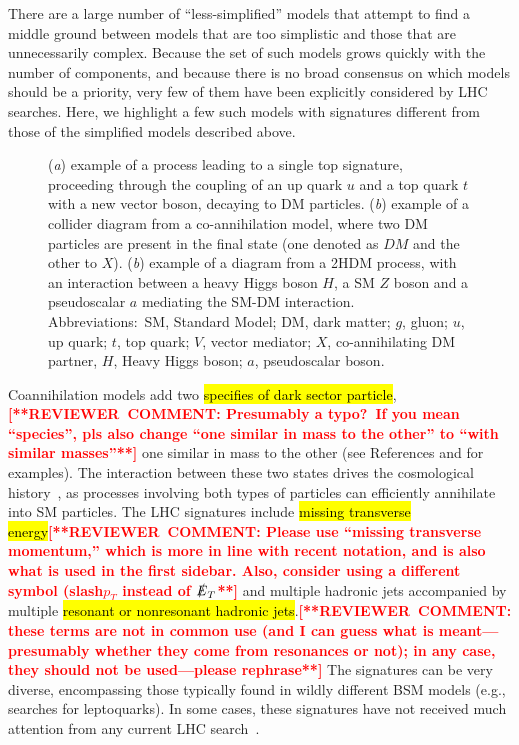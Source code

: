 \documentclass{ar-1col}
\newcommand{\MET}{\ensuremath{\slashed{E}_T}\xspace}
\begin{document}
There are a large number of ``less-simplified'' models that
attempt to find a middle ground between models that are too
simplistic and those that are unnecessarily complex. Because the
set of such models grows quickly with the number of components,
and because there is no broad consensus on which models should be a
priority, very few of them have been explicitly considered by LHC
searches. Here, we highlight a few such models with signatures different from those of
 the simplified models described above.

\begin{figure}[!htpb]
\caption{
(\textit{a}) example of a process leading to a single top signature, proceeding through the coupling of an up quark $u$ and a top quark $t$ with a new vector boson, decaying to DM particles. 
(\textit{b}) example of a collider diagram from a co-annihilation model, where two DM particles are present in the final state (one denoted as $DM$ and the other to $X$). 
(\textit{b}) example of a diagram from a 2HDM process, with an interaction between a heavy Higgs boson $H$, a SM $Z$ boson and a  pseudoscalar $a$ mediating the SM-DM interaction. 
Abbreviations:\ SM, Standard Model; DM, dark matter; $g$, gluon; $u$, up quark; $t$, top quark; $V$, vector mediator; $X$, co-annihilating DM partner, $H$, Heavy Higgs boson; $a$, pseudoscalar boson.}
\label{fig:feynman_2}
\end{figure}

{Coannihilation} models add two \hl{specifies of dark sector
particle},\textbf{\textcolor{red}{[**REVIEWER\ COMMENT: Presumably a typo?\ If you mean ``species'', pls also change ``one similar in mass to the other'' to ``with similar masses''**]}} one similar in mass to the other (see References  and  for examples). The interaction
between these two states drives the cosmological
history~\cite{Ellis:1999mm}, as processes involving both types of
particles can efficiently annihilate into SM particles. The LHC
signatures include \hl{missing transverse energy}\textbf{\textcolor{red}{[**REVIEWER\ COMMENT: Please use ``missing transverse momentum,'' which is more in line with recent notation, and is also what is used in the first sidebar. Also, consider using a different symbol (slash${p_T}$ instead of \MET**]}} and multiple hadronic
jets accompanied by multiple \hl{resonant or nonresonant hadronic
jets}.\textbf{\textcolor{red}{[**REVIEWER\ COMMENT: these terms are not in common use (and I can guess what is meant---presumably whether they come from resonances or not); in any case, they should not be used---please rephrase**]}} The signatures can be very diverse, encompassing those typically
found in wildly different BSM models (e.g., searches for
leptoquarks). In some cases, these signatures have not received much attention from any
current LHC search~\cite{Buschmann:2016hkc}.
\end{document}
